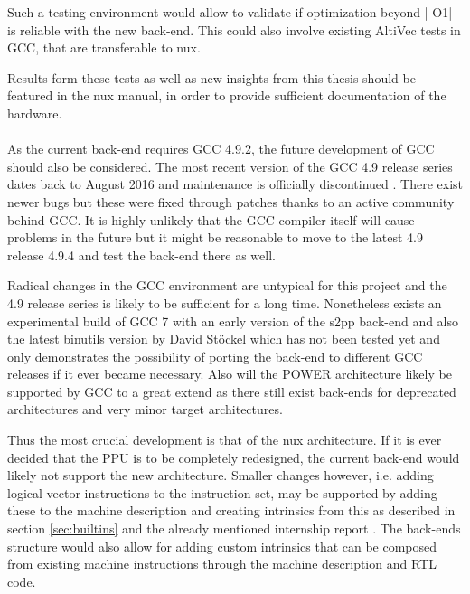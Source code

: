 Such a testing environment would allow to validate if optimization beyond |-O1| is reliable with the new back-end.
This could also involve existing AltiVec tests in GCC, that are transferable to nux.

Results form these tests as well as new insights from this thesis should be featured in the nux manual, in order to provide sufficient documentation of the hardware.
\\
\\
As the current back-end requires GCC 4.9.2, the future development of GCC should also be considered.
The most recent version of the GCC 4.9 release series dates back to August 2016 and maintenance is officially discontinued \cite{GCCweb}.
There exist newer bugs but these were fixed through patches thanks to an active community behind GCC.
It is highly unlikely that the GCC compiler itself will cause problems in the future but it might be reasonable to move to the latest 4.9 release 4.9.4 and test the back-end there as well.

Radical changes in the GCC environment are untypical for this project and the 4.9 release series is likely to be sufficient for a long time. 
Nonetheless exists an experimental build of GCC 7 with an early version of the s2pp back-end and also the latest binutils version by David Stöckel which has not been tested yet and only demonstrates the possibility of porting the back-end to different GCC releases if it ever became necessary.
Also will the POWER architecture likely be supported by GCC to a great extend as there still exist back-ends for deprecated architectures and very minor target architectures.

Thus the most crucial development is that of the nux architecture.
If it is ever decided that the  \ac{PPU} is to be completely redesigned, the current back-end would likely not support the new architecture.
Smaller changes however, i.e. adding logical vector instructions to the instruction set, may be supported by adding these to the machine description and creating intrinsics from this as described in section \ref{sec:builtins} and the already mentioned internship report \citep{heimbrecht_2017internship}.
The back-ends structure would also allow for adding custom intrinsics that can be composed from existing machine instructions through the machine description and \ac{RTL} code.

